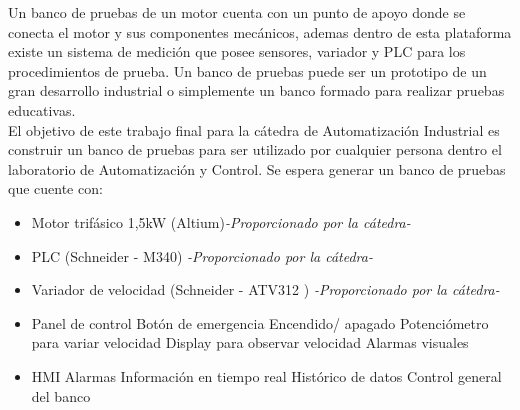 Un banco de pruebas de un motor cuenta con un punto de apoyo donde se conecta el motor y sus componentes mecánicos, ademas dentro de esta plataforma existe un sistema de medición que posee sensores, variador y PLC para los procedimientos de prueba.
Un banco de pruebas puede ser un prototipo de un gran desarrollo industrial o simplemente un banco formado para realizar pruebas educativas. \\

El objetivo de este trabajo final para la cátedra de Automatización Industrial es construir un banco de pruebas para ser utilizado por cualquier persona dentro el laboratorio de Automatización y Control. Se espera generar un banco de pruebas que cuente con:
\begin{itemize}
    \item Motor trifásico 1,5kW (Altium)\textit{-Proporcionado por la cátedra-}
    \item PLC (Schneider - M340) \textit{-Proporcionado por la cátedra-}
    \item Variador de velocidad (Schneider - ATV312 ) \textit{-Proporcionado por la cátedra-}
    \item Panel de control
        \subitem Botón de emergencia
        \subitem Encendido/ apagado
        \subitem Potenciómetro para variar velocidad
        \subitem Display para observar velocidad
        \subitem Alarmas visuales
    \item HMI
        \subitem Alarmas
        \subitem Información en tiempo real
        \subitem Histórico de datos
        \subitem Control general del banco
\end{itemize}

\newpage
